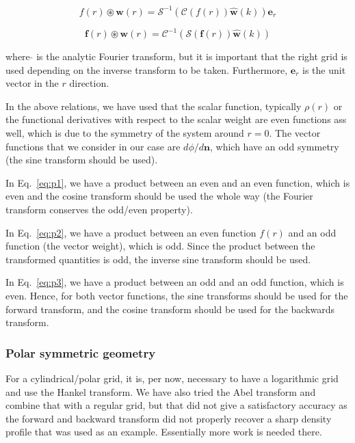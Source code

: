 \documentclass[12pt, letterpaper]{article}
\begin{document}
\begin{equation}
  f(r)\circledast \mathbf{w}(r) = \mathscr{S}^{-1}\left(\mathscr{C}\left(f(r)\right)\hat{\mathbf{w}}(k)\right)\mathbf{e}_r
   \label{eq:p2}
\end{equation}

\begin{equation}
  \mathbf{f}(r)\circledast \mathbf{w}(r) = \mathscr{C}^{-1}\left(\mathscr{S}\left(\mathbf{f}(r)\right)\hat{\mathbf{w}}(k)\right)
   \label{eq:p3}
\end{equation}

where $\hat{}$ is the analytic Fourier transform, but it is important that the right grid is used depending on the inverse transform to be taken. Furthermore, $\mathbf{e}_r$ is the unit vector in the $r$ direction.

In the above relations, we have used that the scalar function, typically $\rho(r)$ or the functional derivatives with respect to the scalar weight are even functions ass well, which is due to the symmetry of the system around $r=0$. The vector functions that we consider in our case are $d\phi/d\mathbf{n}$, which have an odd symmetry (the sine transform should be used).

In Eq.~\ref{eq:p1}, we have a product between an even and an even function, which is even and the cosine transform should be used the whole way (the Fourier transform conserves the odd/even property).

In Eq.~\ref{eq:p2}, we have a product between an even function $f(r)$ and an odd function (the vector weight), which is odd. Since the product between the transformed quantities is odd, the inverse sine transform should be used.

In Eq.~\ref{eq:p3}, we have a product between an odd and an odd function, which is even. Hence, for both vector functions, the sine transforms should be used for the forward transform, and the cosine transform should be used for the backwards transform.

\subsubsection{Polar symmetric geometry}
For a cylindrical/polar grid, it is, per now, necessary to have a
logarithmic grid and use the Hankel transform. We have also tried the
Abel transform and combine that with a regular grid, but that did not
give a satisfactory accuracy as the forward and backward transform did
not properly recover a sharp density profile that was used as an
example. Essentially more work is needed there.
\end{document}
